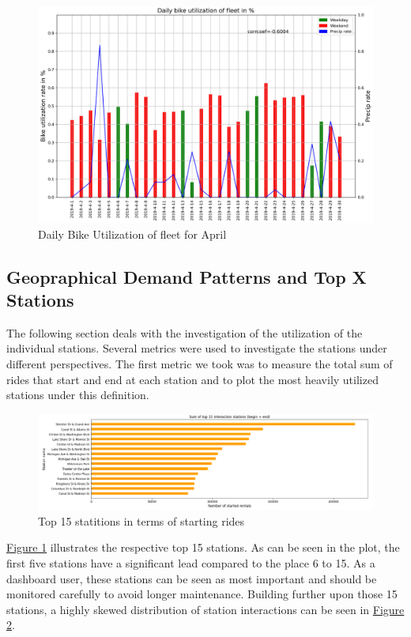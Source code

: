 \begin{figure}[H]
    \centering
    \includegraphics[width=0.7\linewidth]{./Figures/dailyBikeUtilizationApril.png}
    \caption{Daily Bike Utilization of fleet for April}
    \label{dailyBikeUtilizationApril}
\end{figure}

\subsection{Geopraphical Demand Patterns and Top X Stations}
\label{subsec:GeoDemand}

The following section deals with the investigation of the utilization of the individual stations. Several metrics were used to investigate the stations under different perspectives. The first metric we took was to measure the total sum of rides that start and end at each station and to plot the most heavily utilized stations under this definition. 

\begin{figure}[H]
    \centering
    \includegraphics[width=1\linewidth]{./Figures/GeoAbb1.png}
    \caption{Top 15 statitions in terms of starting rides}
    \label{fig1}
\end{figure}


\hyperref[fig1]{Figure 1} illustrates the respective top 15 stations. As can be seen in the plot, the first five stations have a significant lead compared to the place 6 to 15. As a dashboard user, these stations can be seen as most important and should be monitored carefully to avoid longer maintenance. 
Building further upon those 15 stations, a highly skewed distribution of station interactions can be seen in \hyperref[fig4]{Figure 2}. 

